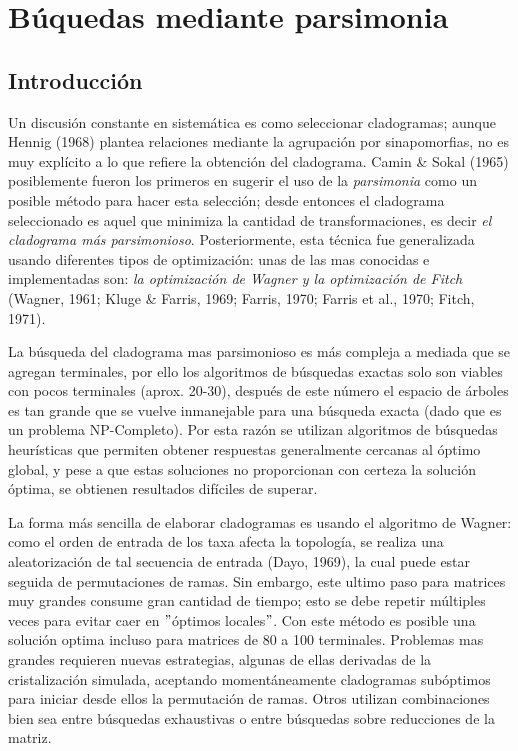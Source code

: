 
\chapter{B\'uquedas mediante parsimonia} %
\label{cha:parsimonia}

\section*{Introducci\'on}
Un discusi\'on constante en sistem\'atica es como seleccionar cladogramas; aunque {\color{red}Hennig (1968)} plantea relaciones mediante la agrupaci\'on por sinapomorfias,  no es muy expl\'icito a lo que refiere la obtenci\'on del cladograma. {\color{red}Camin \& Sokal (1965)} posiblemente fueron los primeros en sugerir el uso de la \textit{parsimonia} como un posible m\'etodo para hacer esta selecci\'on; desde entonces el cladograma seleccionado es aquel que minimiza la cantidad de transformaciones,  es decir \textit{el cladograma más parsimonioso}. Posteriormente,  esta t\'ecnica fue generalizada usando diferentes tipos de optimizaci\'on: unas de las mas conocidas e implementadas son: \textit{la optimizaci\'on de Wagner y la optimizaci\'on de Fitch} {\color{red}(Wagner,  1961; Kluge \& Farris,  1969; Farris,  1970; Farris et al., 1970; Fitch, 1971)}.

La b\'usqueda del cladograma mas parsimonioso es m\'as compleja a mediada que se agregan terminales,  por ello los algoritmos de b\'usquedas exactas solo son viables con pocos terminales (aprox. 20-30),  despu\'es de este n\'umero el espacio de \'arboles es tan grande que se vuelve inmanejable para una búsqueda exacta (dado que es un problema NP-Completo). Por esta raz\'on se utilizan algoritmos de b\'usquedas heur\'isticas que permiten obtener respuestas generalmente cercanas al \'optimo global,  y pese a que estas soluciones no proporcionan con certeza la solución \'optima, se obtienen  resultados  dif\'iciles de superar.

La forma m\'as sencilla de elaborar cladogramas es usando el algoritmo de Wagner: como el orden de entrada de los taxa afecta la topolog\'ia,  se realiza una aleatorización de tal secuencia de entrada {\color{red} (Dayo, 1969)},  la cual puede estar seguida de permutaciones de ramas. Sin embargo,  este ultimo paso para matrices muy grandes consume gran cantidad de tiempo; esto se debe repetir m\'ultiples veces para evitar caer en $"$\'optimos locales$"$. Con este método es posible una solución optima incluso para matrices de 80 a 100 terminales. Problemas mas grandes requieren nuevas estrategias,  algunas de ellas derivadas de la cristalizaci\'on simulada,  aceptando moment\'aneamente cladogramas sub\'optimos para iniciar desde ellos la permutaci\'on de ramas. Otros utilizan combinaciones bien sea entre b\'usquedas exhaustivas o entre búsquedas sobre reducciones de la matriz.

